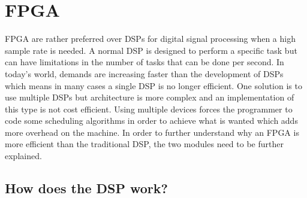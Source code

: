 \section{FPGA}
FPGA are rather preferred over DSPs for digital signal processing when a high sample rate is needed. A normal DSP is designed to perform a specific task but can have limitations in the number of tasks that can be done per second. In today’s world, demands are increasing faster than the development of DSPs which means in many cases a single DSP is no longer efficient. One solution is to use multiple DSPs but architecture is more complex and an implementation of this type is not cost efficient. Using multiple devices forces the programmer to code some scheduling algorithms in order to achieve what is wanted which adds more overhead on the machine. 
In order to further understand why an FPGA is more efficient than the traditional DSP, the two modules need to be further explained.

\subsection{How does the DSP work?}